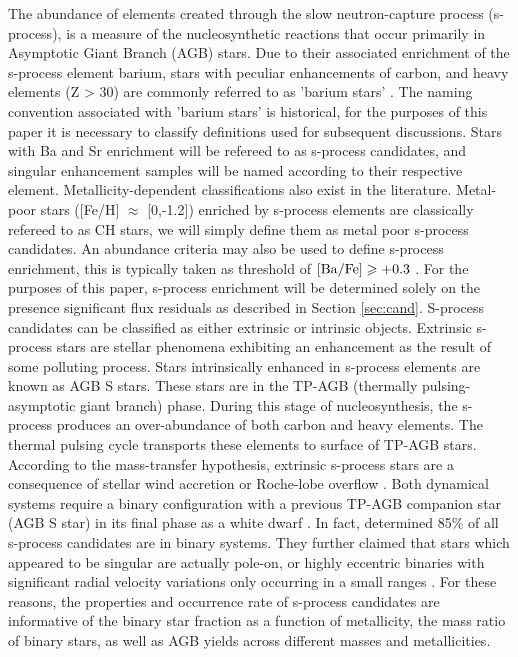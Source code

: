\documentclass[a4paper,fleqn,usenatbib]{mnras}
\begin{document}
The abundance of elements created through the slow neutron-capture process (s-process), is a measure of the nucleosynthetic reactions that occur primarily in Asymptotic Giant Branch (AGB) stars. Due to their associated enrichment of the s-process element barium, stars with peculiar enhancements of carbon, and heavy elements (Z > 30) are commonly referred to as 'barium stars' \citep{Bidelman1951}. The naming convention associated with 'barium stars' is historical, for the purposes of this paper it is necessary to classify definitions used for subsequent discussions. Stars with Ba and Sr enrichment will be refereed to as s-process candidates, and singular enhancement samples will be named according to their respective element. Metallicity-dependent classifications also exist in the literature. Metal-poor stars ([Fe/H] $\approx$ [0,-1.2]) enriched by s-process elements are classically refereed to as CH stars, we will simply define them as metal poor s-process candidates. An abundance criteria may also be used to define s-process enrichment, this is typically taken as threshold of $\rm[Ba/Fe]\geq +0.3$ \citep{malaney1988}. For the purposes of this paper, s-process enrichment will be determined solely on the presence significant flux residuals as described in Section \ref{sec:cand}.
S-process candidates can be classified as either extrinsic or intrinsic objects. Extrinsic s-process stars are stellar phenomena exhibiting an enhancement as the result of some polluting process. Stars intrinsically enhanced in s-process elements are known as AGB S stars. These stars are in the TP-AGB (thermally pulsing-asymptotic giant branch) phase. During this stage of nucleosynthesis, the s-process produces an over-abundance of both carbon and heavy elements. The thermal pulsing cycle transports these elements to surface of TP-AGB stars. According to the mass-transfer hypothesis, extrinsic s-process stars are a consequence of stellar wind accretion \citep{boffin1988,jorissen1992} or Roche-lobe overflow \citep{webbink1986}. Both dynamical systems require a binary configuration with a previous TP-AGB companion star (AGB S star) in its final phase as a white dwarf \citep{bohm1980,bohm1984}. In fact, \citet{mcclure1983} determined 85\% of all s-process candidates are in binary systems. They further claimed that stars which appeared to be singular are actually pole-on, or highly eccentric binaries with significant radial velocity variations only occurring in a small ranges \citep{pourbaix2004}. For these reasons, the properties and occurrence rate of s-process candidates are informative of the binary star fraction as a function of metallicity, the mass ratio of binary stars, as well as AGB yields across different masses and metallicities. 
\end{document}
